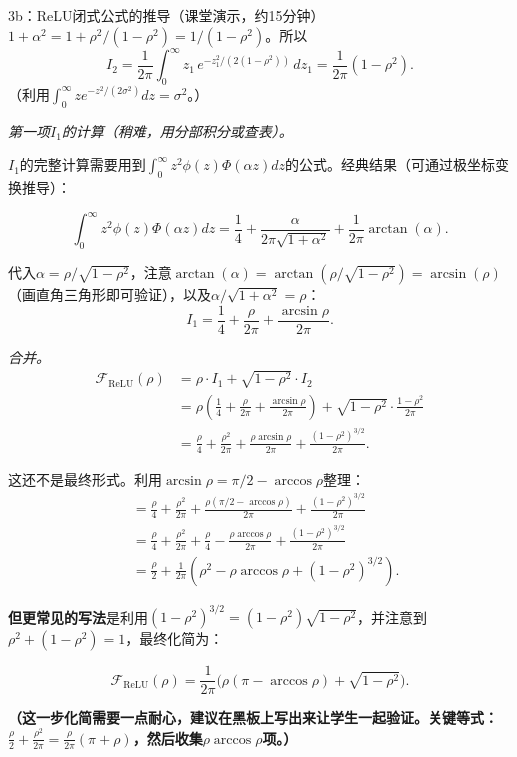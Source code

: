 \documentclass[11pt,a4paper]{article}
\begin{document}
\begin{handcalc}{3b：ReLU闭式公式的推导（课堂演示，约15分钟）}
$1+\alpha^2 = 1+\rho^2/(1-\rho^2)=1/(1-\rho^2)$。所以
\[
I_2 = \frac{1}{2\pi}\int_0^\infty z_1\,e^{-z_1^2/(2(1-\rho^2))}\,dz_1 = \frac{1}{2\pi}(1-\rho^2).
\]
（利用$\int_0^\infty z e^{-z^2/(2\sigma^2)}dz = \sigma^2$。）

\medskip
\textit{第一项$I_1$的计算（稍难，用分部积分或查表）。}

$I_1$的完整计算需要用到$\int_0^\infty z^2\phi(z)\Phi(\alpha z)dz$的公式。经典结果（可通过极坐标变换推导）：

\[
\int_0^\infty z^2\phi(z)\Phi(\alpha z)dz = \frac{1}{4}+\frac{\alpha}{2\pi\sqrt{1+\alpha^2}}+\frac{1}{2\pi}\arctan(\alpha).
\]

代入$\alpha=\rho/\sqrt{1-\rho^2}$，注意$\arctan(\alpha)=\arctan(\rho/\sqrt{1-\rho^2})=\arcsin(\rho)$（画直角三角形即可验证），以及$\alpha/\sqrt{1+\alpha^2}=\rho$：
\[
I_1 = \frac{1}{4}+\frac{\rho}{2\pi}+\frac{\arcsin\rho}{2\pi}.
\]

\medskip
\textit{合并。}
\begin{align}
\mathcal{F}_{\text{ReLU}}(\rho) &= \rho\cdot I_1 + \sqrt{1-\rho^2}\cdot I_2 \\
&= \rho\left(\frac{1}{4}+\frac{\rho}{2\pi}+\frac{\arcsin\rho}{2\pi}\right) + \sqrt{1-\rho^2}\cdot\frac{1-\rho^2}{2\pi} \\
&= \frac{\rho}{4}+\frac{\rho^2}{2\pi}+\frac{\rho\arcsin\rho}{2\pi}+\frac{(1-\rho^2)^{3/2}}{2\pi}.
\end{align}

这还不是最终形式。利用$\arcsin\rho = \pi/2-\arccos\rho$整理：
\begin{align}
&= \frac{\rho}{4}+\frac{\rho^2}{2\pi}+\frac{\rho(\pi/2-\arccos\rho)}{2\pi}+\frac{(1-\rho^2)^{3/2}}{2\pi} \\
&= \frac{\rho}{4}+\frac{\rho^2}{2\pi}+\frac{\rho}{4}-\frac{\rho\arccos\rho}{2\pi}+\frac{(1-\rho^2)^{3/2}}{2\pi} \\
&= \frac{\rho}{2}+\frac{1}{2\pi}\left(\rho^2-\rho\arccos\rho+(1-\rho^2)^{3/2}\right).
\end{align}

\textbf{但更常见的写法}是利用$(1-\rho^2)^{3/2}=(1-\rho^2)\sqrt{1-\rho^2}$，并注意到$\rho^2+(1-\rho^2)=1$，最终化简为：

\[
\boxed{\mathcal{F}_{\text{ReLU}}(\rho) = \frac{1}{2\pi}\Big(\rho(\pi-\arccos\rho)+\sqrt{1-\rho^2}\Big).}
\]

\textbf{（这一步化简需要一点耐心，建议在黑板上写出来让学生一起验证。关键等式：$\frac{\rho}{2}+\frac{\rho^2}{2\pi}=\frac{\rho}{2\pi}(\pi+\rho)$，然后收集$\rho\arccos\rho$项。）}


\end{handcalc}
\end{document}
